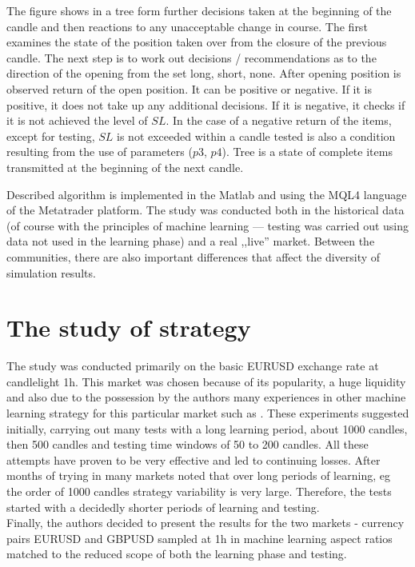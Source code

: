 \documentclass[runningheads,a4paper]{llncs}
\begin{document}
The figure shows in a tree form further decisions taken at the beginning of the candle and then reactions to any unacceptable change in course. The first examines the state of the position taken over from the closure of the previous candle. The next step is to work out decisions / recommendations as to the direction of the opening from the set {long, short, none}. After opening position is observed return of the open position. It can be positive or negative. If it is positive, it does not take up any additional decisions. If it is negative, it checks if it is not achieved the level of $SL$. In the case of a negative return of the items, except for testing, $SL$ is not exceeded within a candle tested is also a condition resulting from the use of parameters ($p3$, $p4$). Tree is a state of complete items transmitted at the beginning of the next candle.

Described algorithm is implemented in the Matlab and using the MQL4 language of the Metatrader platform. The study was conducted both in the historical data (of course with the principles of machine learning --- testing was carried out using data not used in the learning phase) and a real ,,live'' market. Between the communities, there are also important differences that affect the diversity of simulation results.

\section{The study of strategy}
The study was conducted primarily on the basic EURUSD exchange rate at candlelight 1h. This market was chosen because of its popularity, a huge liquidity and also due to the possession by the authors many experiences in other machine learning strategy for this particular market such as \cite{Wilinski2014}. These experiments suggested initially, carrying out many tests with a long learning period, about 1000 candles, then 500 candles and testing time windows of 50 to 200 candles. All these attempts have proven to be very effective and led to continuing losses. After months of trying in many markets noted that over long periods of learning, eg the order of 1000 candles strategy variability is very large. Therefore, the tests started with a decidedly shorter periods of learning and testing.\\

Finally, the authors decided to present the results for the two markets - currency pairs EURUSD and GBPUSD sampled at 1h in machine learning aspect ratios matched to the reduced scope of both the learning phase and testing.\\
\end{document}
